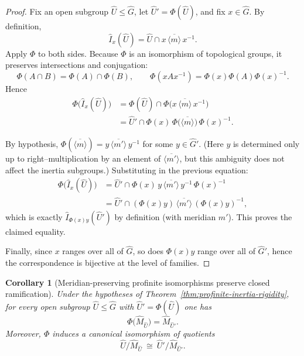 \documentclass[11pt]{article}
\newtheorem{corollary}[theorem]{Corollary}
\begin{document}
	\begin{proof}
		Fix an open subgroup $\widehat U\le \widehat G$, let $\widehat U'=\Phi(\widehat U)$, and fix $x\in \widehat G$. By definition,
		\[ \widehat I_x(\widehat U)=\widehat U\cap x\,\overline{\langle m\rangle}\,x^{-1}.\]
		Apply $\Phi$ to both sides. Because $\Phi$ is an isomorphism of topological groups, it preserves intersections and conjugation:
		\[ \Phi(A\cap B)=\Phi(A)\cap \Phi(B),\qquad \Phi(xAx^{-1})=\Phi(x)\Phi(A)\Phi(x)^{-1}.\]
		Hence
		\begin{align*}
			\Phi\big(\widehat I_x(\widehat U)\big) &= \Phi(\widehat U)\cap \Phi\big(x\,\overline{\langle m\rangle}\,x^{-1}\big) \\
			&= \widehat U'\cap \Phi(x)\,\Phi\big(\overline{\langle m\rangle}\big)\,\Phi(x)^{-1}.
		\end{align*}
		
		By hypothesis, $\Phi(\overline{\langle m\rangle})=y\,\overline{\langle m'\rangle}\,y^{-1}$ for some $y\in \widehat G'$. (Here $y$ is determined only up to right--multiplication by an element of $\overline{\langle m'\rangle}$, but this ambiguity does not affect the inertia subgroups.) Substituting in the previous equation:
		\begin{align*}
			\Phi\big(\widehat I_x(\widehat U)\big) &= \widehat U'\cap \Phi(x)\,y\,\overline{\langle m'\rangle}\,y^{-1}\,\Phi(x)^{-1} \\
			&= \widehat U'\cap (\Phi(x)y)\,\overline{\langle m'\rangle}\,(\Phi(x)y)^{-1},
		\end{align*}
		which is exactly $\widehat I_{\Phi(x)y}(\widehat U')$ by definition (with meridian $m'$). This proves the claimed equality.
		
		Finally, since $x$ ranges over all of $\widehat G$, so does $\Phi(x)y$ range over all of $\widehat G'$, hence the correspondence is bijective at the level of families.
	\end{proof}
	
	\begin{corollary}[Meridian-preserving profinite isomorphisms preserve closed ramification]\label{thm:profinite-ramification-rigidity}
	Under the hypotheses of Theorem~\ref{thm:profinite-inertia-rigidity}, for every open subgroup $\widehat U\le \widehat G$ with $\widehat U'=\Phi(\widehat U)$ one has
		\[ \Phi\big(\widehat M_{\widehat U}\big)=\widehat M_{\widehat U'}.\]
		Moreover, $\Phi$ induces a canonical isomorphism of quotients
		\[ \widehat U/\widehat M_{\widehat U}\ \cong\ \widehat U'/\widehat M_{\widehat U'}.\]
	\end{corollary}
	
\end{document}
